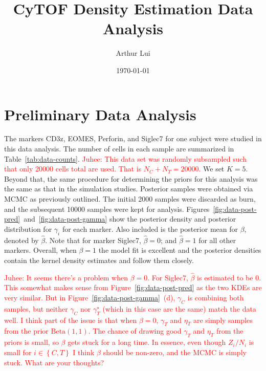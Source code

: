 \documentclass[12pt]{article} %
\title{CyTOF Density Estimation Data Analysis}
\author{Arthur Lui}
\date{\today} %
\newcommand{\bc}[1]{ \left\{#1\right\} }
\newcommand{\Beta}{\text{Beta}}
\newcommand{\alert}[1]{\textcolor{red}{#1}}
\begin{document}
\maketitle

\section{Preliminary Data Analysis}
The markers CD3z, EOMES, Perforin, and Siglec7 for one subject were studied
in this data analysis. The number of cells in each sample are summarized in 
Table~\ref{tab:data-counts}.
%
\alert{Juhee: This data set was randomly subsampled such that only 20000
cells total are used. That is $N_C + N_T = 20000$.}
%
We set $K=5$. Beyond that, the same procedure for determining the priors for
this analysis was the same as that in the simulation studies. Posterior
samples were obtained via MCMC as previously outlined. The initial 2000
samples were discarded as burn, and the subsequent 10000 samples were kept
for analysis. Figures~\ref{fig:data-post-pred}~and~\ref{fig:data-post-gamma}
show the posterior density and posterior distribution for $\gamma_i$ for each
marker. Also included is the posterior mean for $\beta$, denoted by
$\hat\beta$. Note that for marker Siglec7, $\hat\beta=0$; and $\hat\beta=1$
for all other markers. Overall, when $\beta=1$ the model fit is excellent and
the posterior densities contain the kernel density estimates and follow them
closely.

\alert{Juhee: It seems there's a problem when $\beta=0$. For Siglec7,
$\hat\beta$ is estimated to be 0. This somewhat makes sense from
Figure~\ref{fig:data-post-pred} as the two KDEs are very similar. But in
Figure~\ref{fig:data-post-gamma}~(d), $\gamma_C$ is combining both samples,
but neither $\gamma_C$ nor $\gamma_T^\star$ (which in this case are the same)
match the data well. I think part of the issue is that when $\beta=0$,
$\gamma_T$ and $\eta_T$ are simply samples from the prior $\Beta(1,1)$. The
chance of drawing good $\gamma_T$ and $\eta_T$ from the priors is small, so
$\beta$ gets stuck for a long time. In essence, even though $Z_i/N_i$ is
small for $i\in\bc{C,T}$ I think $\hat\beta$ should be non-zero, and the MCMC
is simply stuck. What are your thoughts?}
\end{document}
